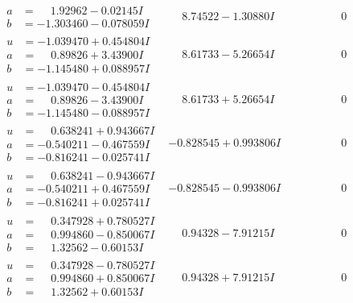 \documentclass[1p]{elsarticle_modified}
\theoremstyle{definition}
\begin{document}
$$\begin{array}{c|c|c}
\begin{aligned}
a &= \phantom{-}1.92962 - 0.02145 I \\
b &= -1.303460 - 0.078059 I\end{aligned}
 & \phantom{-}8.74522 - 1.30880 I & \phantom{-0.000000 } 0 \\ \hline\begin{aligned}
u &= -1.039470 + 0.454804 I \\
a &= \phantom{-}0.89826 + 3.43900 I \\
b &= -1.145480 + 0.088957 I\end{aligned}
 & \phantom{-}8.61733 - 5.26654 I & \phantom{-0.000000 } 0 \\ \hline\begin{aligned}
u &= -1.039470 - 0.454804 I \\
a &= \phantom{-}0.89826 - 3.43900 I \\
b &= -1.145480 - 0.088957 I\end{aligned}
 & \phantom{-}8.61733 + 5.26654 I & \phantom{-0.000000 } 0 \\ \hline\begin{aligned}
u &= \phantom{-}0.638241 + 0.943667 I \\
a &= -0.540211 - 0.467559 I \\
b &= -0.816241 - 0.025741 I\end{aligned}
 & -0.828545 + 0.993806 I & \phantom{-0.000000 } 0 \\ \hline\begin{aligned}
u &= \phantom{-}0.638241 - 0.943667 I \\
a &= -0.540211 + 0.467559 I \\
b &= -0.816241 + 0.025741 I\end{aligned}
 & -0.828545 - 0.993806 I & \phantom{-0.000000 } 0 \\ \hline\begin{aligned}
u &= \phantom{-}0.347928 + 0.780527 I \\
a &= \phantom{-}0.994860 - 0.850067 I \\
b &= \phantom{-}1.32562 - 0.60153 I\end{aligned}
 & \phantom{-}0.94328 - 7.91215 I & \phantom{-0.000000 } 0 \\ \hline\begin{aligned}
u &= \phantom{-}0.347928 - 0.780527 I \\
a &= \phantom{-}0.994860 + 0.850067 I \\
b &= \phantom{-}1.32562 + 0.60153 I\end{aligned}
 & \phantom{-}0.94328 + 7.91215 I & \phantom{-0.000000 } 0 \\ \hline\begin{aligned}

\end{aligned}
\end{array}$$
\end{document}
